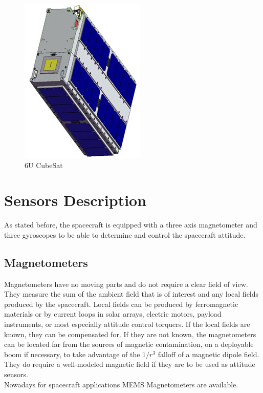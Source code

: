 \documentclass[11pt,a4paper]{report}
\begin{document}
\begin{figure}[H]
 	\centering
 	\includegraphics[scale=0.4]{gfx/cubesat_panels.jpg}
    \caption{6U CubeSat}
\end{figure}

\section{Sensors Description}
As stated before, the spacecraft is equipped with a three axis magnetometer and three gyroscopes to be able to determine and control the spacecraft attitude.
\subsection{Magnetometers}
Magnetometers have no moving parts and do not require a clear field of view.
They measure the sum of the ambient field that is of interest and
any local fields produced by the spacecraft. Local fields can be produced by
ferromagnetic materials or by current loops in solar arrays, electric motors, payload instruments, or most especially attitude control torquers. If the local fields are known, they can be compensated for. If they are not known, the magnetometers can be located far from the sources of magnetic contamination, on a deployable boom if necessary, to take advantage of the $1/r^3$ falloff of a magnetic dipole field. \\
They do require a well-modeled magnetic field if they are to be used as attitude sensors.\\
Nowadays for spacecraft applications MEMS Magnetometers are available.\\
\end{document}
